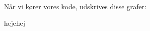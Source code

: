 \documentclass[12pt, letterpaper]{article}
\begin{document}
Når vi kører vores kode, udskrives disse grafer: 

\begin{figure}[!h]
           \begin{floatrow}
            
           \end{floatrow}
\end{figure}
hejehej
\end{document}
